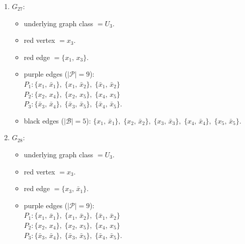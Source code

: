 \begin{enumerate}[leftmargin=*]
\begin{itemize}[leftmargin=*]
\item purple edges ($|\mathcal{P}|=9$):\mbox{}\\
$P_{1}: \{x_{2},\,x_{4}\},\; \{x_{2},\,x_{5}\},\; \{x_{4},\,x_{5}\}$\\
$P_{2}: \{x_{3},\,\bar{x}_{1}\},\; \{x_{3},\,\bar{x}_{2}\},\; \{\bar{x}_{1},\,\bar{x}_{2}\}$\\
$P_{3}: \{\bar{x}_{3},\,\bar{x}_{4}\},\; \{\bar{x}_{3},\,\bar{x}_{5}\},\; \{\bar{x}_{4},\,\bar{x}_{5}\}$.
\item black edges ($|\mathcal{B}|=5$): $\{x_{1},\,\bar{x}_{1}\},\; \{x_{2},\,\bar{x}_{2}\},\; \{x_{3},\,\bar{x}_{3}\},\; \{x_{4},\,\bar{x}_{4}\},\; \{x_{5},\,\bar{x}_{5}\}$.
\end{itemize}
\item $G_{27}$:
\begin{itemize}[leftmargin=*]
\item underlying graph class $= U_3$.
\item red vertex $= x_{3}$.
\item red edge $= \{x_{1},\,x_{3}\}$.
\item purple edges ($|\mathcal{P}|=9$):\mbox{}\\
$P_{1}: \{x_{1},\,\bar{x}_{1}\},\; \{x_{1},\,\bar{x}_{2}\},\; \{\bar{x}_{1},\,\bar{x}_{2}\}$\\
$P_{2}: \{x_{2},\,x_{4}\},\; \{x_{2},\,x_{5}\},\; \{x_{4},\,x_{5}\}$\\
$P_{3}: \{\bar{x}_{3},\,\bar{x}_{4}\},\; \{\bar{x}_{3},\,\bar{x}_{5}\},\; \{\bar{x}_{4},\,\bar{x}_{5}\}$.
\item black edges ($|\mathcal{B}|=5$): $\{x_{1},\,\bar{x}_{1}\},\; \{x_{2},\,\bar{x}_{2}\},\; \{x_{3},\,\bar{x}_{3}\},\; \{x_{4},\,\bar{x}_{4}\},\; \{x_{5},\,\bar{x}_{5}\}$.
\end{itemize}
\item $G_{28}$:
\begin{itemize}[leftmargin=*]
\item underlying graph class $= U_3$.
\item red vertex $= x_{3}$.
\item red edge $= \{x_{3},\,\bar{x}_{1}\}$.
\item purple edges ($|\mathcal{P}|=9$):\mbox{}\\
$P_{1}: \{x_{1},\,\bar{x}_{1}\},\; \{x_{1},\,\bar{x}_{2}\},\; \{\bar{x}_{1},\,\bar{x}_{2}\}$\\
$P_{2}: \{x_{2},\,x_{4}\},\; \{x_{2},\,x_{5}\},\; \{x_{4},\,x_{5}\}$\\
$P_{3}: \{\bar{x}_{3},\,\bar{x}_{4}\},\; \{\bar{x}_{3},\,\bar{x}_{5}\},\; \{\bar{x}_{4},\,\bar{x}_{5}\}$.

\end{itemize}
\end{enumerate}
